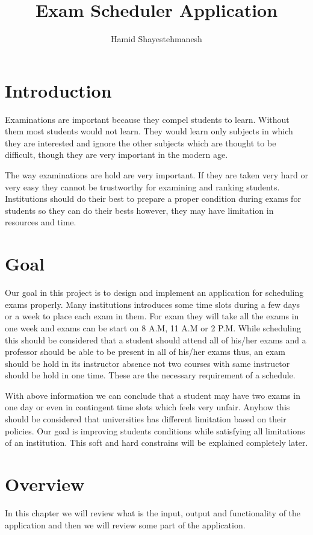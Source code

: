 \documentclass{report}
\begin{document}
\author{Hamid Shayestehmanesh}
\title{Exam Scheduler Application}
\maketitle
\tableofcontents
\newpage
\chapter{Introduction}
Examinations are important because they compel students to learn. Without them most students would not learn. They would learn only subjects in which they are interested and ignore the other subjects which are thought to be difficult, though they are very important in the modern age. 
\par
The way examinations are hold are very important. If they are taken very hard or very easy they cannot be trustworthy for examining and ranking students. Institutions should do their best to prepare a proper condition during exams for students so they can do their bests however, they may have limitation in resources and time.
\chapter{Goal}
Our goal in this project is to design and implement an application for scheduling exams properly. Many institutions introduces some time slots during a few days or a week to place each exam in them. For exam they will take all the exams in one week and exams can be start on 8 A.M, 11 A.M or 2 P.M. While scheduling this should be considered that a student should attend all of his/her exams and a professor should be able to be present in all of his/her exams thus, an exam should be hold in its instructor absence not two courses with same instructor should be hold in one time. These are the necessary requirement of a schedule. \par
With above information we can conclude that a student may have two exams in one day or even in contingent time slots which feels very unfair. Anyhow this should be considered that universities has different limitation based on their policies. Our goal is improving students conditions while satisfying all limitations of an institution. This soft and hard constrains will be explained completely later.

\chapter{Overview}
In this chapter we will review what is the input, output and functionality of the application and then we will review some part of the application.
\end{document}
